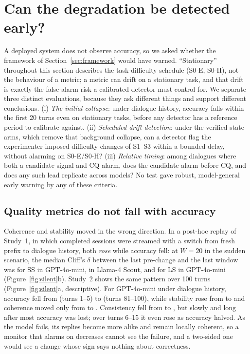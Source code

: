 \section{Can the degradation be detected early?}
\label{sec:monitoring}

A deployed system does not observe accuracy, so we asked whether the framework
of Section~\ref{sec:framework} would have warned. ``Stationary'' throughout
this section describes the task-difficulty schedule (S0-E, S0-H), not the
behaviour of a metric; a metric can drift on a stationary task, and that
drift is exactly the false-alarm risk a calibrated detector must control for.
We separate three distinct evaluations, because they ask different things and
support different conclusions. (i) \emph{The initial collapse}: under
dialogue history, accuracy falls within the first 20 turns even on stationary
tasks, before any detector has a reference period to calibrate against. (ii)
\emph{Scheduled-drift detection}: under the verified-state arms, which remove
that background collapse, can a detector flag the experimenter-imposed
difficulty changes of S1--S3 within a bounded delay, without alarming on
S0-E/S0-H? (iii) \emph{Relative timing}: among dialogues where both a
candidate signal and CQ alarm, does the candidate alarm before CQ, and does
any such lead replicate across models? No test gave robust, model-general
early warning by any of these criteria.

\subsection{Quality metrics do not fall with accuracy}

Coherence and stability moved in the wrong direction. In a post-hoc replay of
Study~1, in which completed sessions were streamed with a switch from fresh
prefix to dialogue history, both \emph{rose} while accuracy fell: at $W=20$ in
the sudden scenario, the median Cliff's $\delta$ \citep{cliff1993dominance}
between the last pre-change and the last window was \replaySsDeltaGpt{} for SS
in GPT-4o-mini, \replaySsDeltaLlama{} in Llama-4 Scout, and \replayLsDeltaGpt{}
for LS in GPT-4o-mini (Figure~\ref{fig:silent}b). Study~2 shows the same
pattern over 100 turns (Figure~\ref{fig:silent}a, descriptive). For GPT-4o-mini
under dialogue history, accuracy fell from \silentCQEarly{} (turns 1--5) to
\silentCQLate{} (turns 81--100), while stability rose from \silentSSEarly{} to
\silentSSLate{} and coherence moved only from \silentLSEarly{} to
\silentLSLate{}. Consistency fell from \silentCSEarly{} to \silentCSLate{}, but
slowly and long after most accuracy was lost; over turns 6--15 it even rose as
accuracy halved. As the model fails, its replies become more alike and remain
locally coherent, so a monitor that alarms on decreases cannot see the failure,
and a two-sided one would see a change whose sign says nothing about
correctness.

